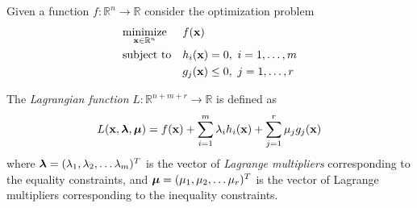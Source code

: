 Given a function $f: \mathbb{R}^n \rightarrow \mathbb{R}$ consider the optimization problem
\begin{equation}
\begin{aligned}
& \underset{\mathbf{x} \in \mathbb{R}^n}{\text{minimize}}
	& & f(\mathbf{x}) \\
& \text{subject to}
      & &  h_i(\mathbf{x})=0, \text{  }i=1,\dots,m\\
&       & & g_j(\mathbf{x})\le0, \text{  }j=1,\dots,r\\
\end{aligned}
\label{e:optimization}
\end{equation}
\begin{definition}[Lagrangian]
The \emph{Lagrangian function} $L: \mathbb{R}^{n+m+r} \rightarrow \mathbb{R}$ is defined as
\begin{equation}
	\label{e:lagrangian}
	L(\mathbf{x},\boldsymbol{\lambda},\boldsymbol{\mu})=f(\mathbf{x})+ \sum_{i=1}^m \lambda_i h_i(\mathbf{x}) + \sum_{j=1}^r \mu_j g_j(\mathbf{x})
\end{equation}
where $\boldsymbol{\lambda}=(\lambda_1, \lambda_2, \dots \lambda_m)^T$ is the vector of \emph{Lagrange multipliers} corresponding to the equality constraints, and $\boldsymbol{\mu}=(\mu_1, \mu_2, \dots \mu_r)^T$ is the vector of Lagrange multipliers corresponding to the inequality constraints.
\end{definition}




